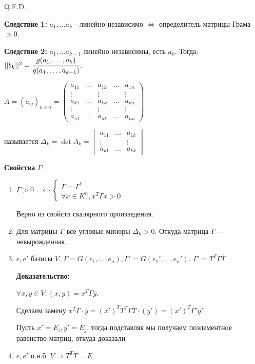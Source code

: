 \hfill Q.E.D.

\textbf{Следствие 1:} $a_1,\ldots a_k$ - линейно-независимо $\Leftrightarrow$ определитель матрицы Грама $>0$.

\textbf{Следствие 2:} $a_1,\ldots a_{k-1}$ линейно независимы, есть $a_k$. Тогда: $||b_k||^2 = \cfrac{g(a_1,\ldots ,a_k)}{g(a_1,\ldots,a_{k-1})}$.

 $A = (a_{ij})_{n\times n} = \begin{pmatrix}
        a_{11} & \ldots & a_{1k} & \ldots & a_{1n}\\
        \vdots & & \vdots & & \vdots\\
        a_{k1} & \ldots & a_{kk} & \ldots & a_{kn}\\
        \vdots & & \vdots & & \vdots\\
        a_{n1} & \ldots & a_{nk} &\ldots & a_{nn}
    \end{pmatrix}$

 называется $\Delta_k = \det A_k = \begin{vmatrix}
    a_{11} & \ldots & a_{1k} \\
    \vdots & & \vdots \\
     a_{k1} & \ldots & a_{kk}
\end{vmatrix}$

\textbf{Свойства} $\Gamma$:
\begin{enumerate}
    \item $\Gamma >0$ . $\Leftrightarrow \begin{cases}
        \Gamma = \Gamma^*\\
        \forall x \in K^n, x^T \Gamma \overline{x} >0 
    \end{cases}$

    Верно из свойств скалярного произведения.   

    \item Для матрицы $\Gamma$ все угловые миноры $\Delta_k >0$. Откуда матрица $\Gamma$ --- невырожденная.

    \item $e,e'$ базисы $V$. $\Gamma = G(e_1,\ldots ,e_n), \Gamma' = G(e_1',\ldots,e_n')$. $\Gamma' = T^T\Gamma \overline{T}$

    \textbf{Доказательство:}

    $\forall x,y \in V: (x,y) = x^T \Gamma \overline{y}$.

    Сделаем замену $x^T \Gamma \cdot \overline{y}  = (x')^T T^T \Gamma \overline{T}\cdot \overline{(y')}= (x')^T \Gamma' \overline{y'}$

    Пусть $x' = E_i, y' = E_j$, тогда подставляя мы получаем поэлементное равенство матриц, откуда доказали

    \item $e,e'$ о.н.б. $V \Rightarrow T^T \overline{T} = E$

\end{enumerate}

